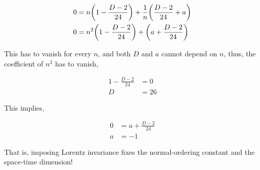 \begin{align*}
    0&=n\qty(1-\frac{D-2}{24})+\frac1n\qty(\frac{D-2}{24}+a)\\
    0&=n^2\qty(1-\frac{D-2}{24})+\qty(a+\frac{D-2}{24})
\end{align*}

This has to vanish for every $n$, and both $D$ and $a$ cannot depend on $n$, thus, the coefficient of $n^2$ 
has to vanish,

\begin{align*}
    1-\frac{D-2}{24}&=0\\
    D&=26
\end{align*}

This implies,

\begin{align*}
    0&=a+\frac{D-2}{24}\\
    a&=-1
\end{align*}

That is, imposing Lorentz invariance fixes the normal-ordering constant and the space-time dimension!